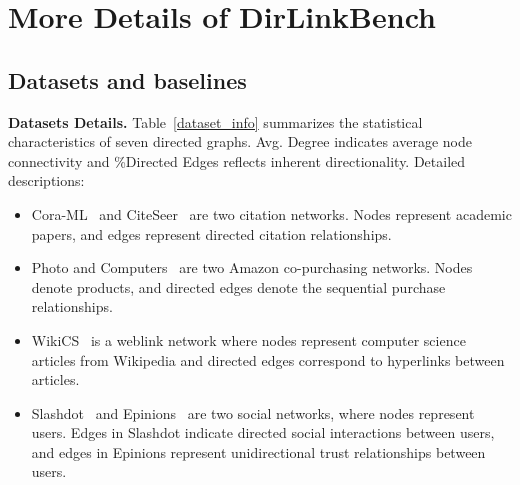 
\hypertarget{app:experiments}{} 
\section{More Details of DirLinkBench} \label{app:experiments}

\hypertarget{app_dataset_baseline}{} 
\subsection{Datasets and baselines}\label{app_dataset_baseline}
\textbf{Datasets Details.}
Table~\ref{dataset_info} summarizes the statistical characteristics of seven directed graphs. Avg. Degree indicates average node connectivity and \%Directed Edges reflects inherent directionality. Detailed descriptions:
\begin{itemize}
    \item Cora-ML~\cite{mccallum2000cora_ml,bojchevski2018cora_ml} and CiteSeer~\cite{sen2008citeseer} are two citation networks. 
    Nodes represent academic papers, and edges represent directed citation relationships.
    \item Photo and Computers~\cite{shchur2018computerandphoto} are two Amazon co-purchasing networks. Nodes denote products, and directed edges denote the sequential purchase relationships.
    \item WikiCS~\cite{mernyei2020wiki} is a weblink network where nodes represent computer science articles from Wikipedia and directed edges correspond to hyperlinks between articles.
    \item Slashdot~\cite{ordozgoiti2020slash} and Epinions~\cite{massa2005epinion} are two social networks, where nodes represent users. Edges in Slashdot indicate directed social interactions between users, and edges in Epinions represent unidirectional trust relationships between users.
\end{itemize}


\begin{table*}[h]
\centering
\caption{Statistics of DirLinkBench datasets.}
\label{dataset_info}
\end{table*}


